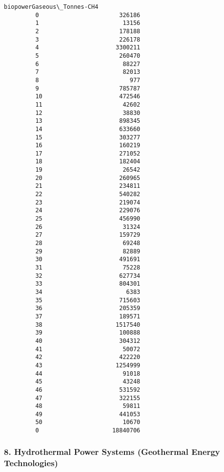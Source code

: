 \documentclass[11pt]{article}
\begin{document}
\begin{Verbatim}[commandchars=\\\{\}]
             biopowerGaseous\_Tonnes-CH4  
         0                       326186  
         1                        13156  
         2                       178188  
         3                       226178  
         4                      3300211  
         5                       260470  
         6                        88227  
         7                        82013  
         8                          977  
         9                       785787  
         10                      472546  
         11                       42602  
         12                       38830  
         13                      898345  
         14                      633660  
         15                      303277  
         16                      160219  
         17                      271052  
         18                      182404  
         19                       26542  
         20                      260965  
         21                      234811  
         22                      540282  
         23                      219074  
         24                      229076  
         25                      456990  
         26                       31324  
         27                      159729  
         28                       69248  
         29                       82889  
         30                      491691  
         31                       75228  
         32                      627734  
         33                      804301  
         34                        6383  
         35                      715603  
         36                      205359  
         37                      189571  
         38                     1517540  
         39                      100888  
         40                      304312  
         41                       50072  
         42                      422220  
         43                     1254999  
         44                       91018  
         45                       43248  
         46                      531592  
         47                      322155  
         48                       59811  
         49                      441053  
         50                       10670  
         0                     18840706  
\end{Verbatim}
            
    \subsubsection{8. Hydrothermal Power Systems (Geothermal Energy
Technologies)}\label{hydrothermal-power-systems-geothermal-energy-technologies}
\end{document}
